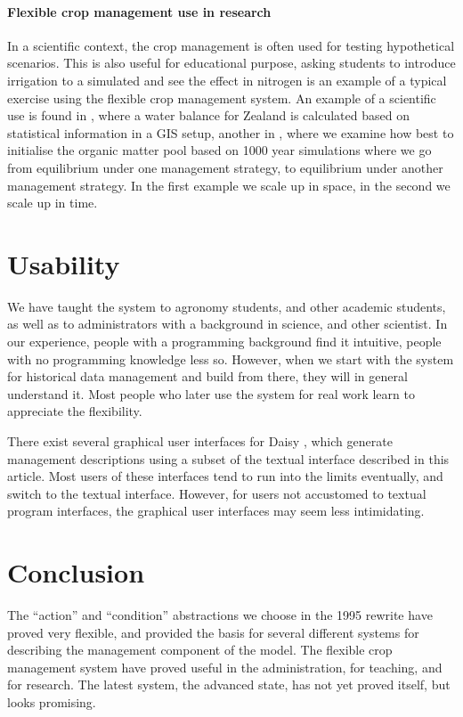 \documentclass[a4paper]{article}
\begin{document}
\paragraph{Flexible crop management use in research} In a scientific
context, the crop management is often used for testing hypothetical
scenarios.  This is also useful for educational purpose, asking
students to introduce irrigation to a simulated and see the effect in
nitrogen is an example of a typical exercise using the flexible crop
management system.  An example of a scientific use is found in
\cite{boegh04a}, where a water balance for Zealand is calculated based
on statistical information in a GIS setup, another in \cite{org-init},
where we examine how best to initialise the organic matter pool based
on 1000 year simulations where we go from equilibrium under one
management strategy, to equilibrium under another management strategy.
In the first example we scale up in space, in the second we scale up
in time.

\section{Usability}

We have taught the system to agronomy students, and other academic
students, as well as to administrators with a background in science,
and other scientist.  In our experience, people with a programming
background find it intuitive, people with no programming knowledge
less so.  However, when we start with the system for historical data
management and build from there, they will in general understand it.
Most people who later use the system for real work learn to appreciate
the flexibility.

There exist several graphical user interfaces for Daisy
\cite{plantinfo-daisy,daisygis,fertorganic}, which generate management
descriptions using a subset of the textual interface described in this
article.  Most users of these interfaces tend to run into the limits
eventually, and switch to the textual interface.  However, for users
not accustomed to textual program interfaces, the graphical user
interfaces may seem less intimidating.

\section{Conclusion}

The ``action'' and ``condition'' abstractions we choose in the 1995
rewrite have proved very flexible, and provided the basis for several
different systems for describing the management component of the
model.  The flexible crop management system have proved useful in the
administration, for teaching, and for research.  The latest system, the
advanced state, has not yet proved itself, but looks promising.  
\end{document}
